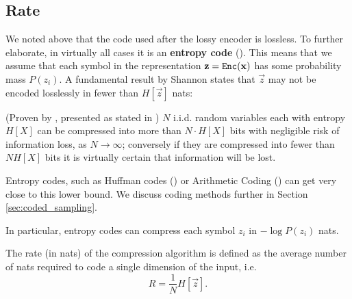 \subsection{Rate}
We noted above that the code used after the lossy encoder is lossless. To
further elaborate, in virtually all cases it is an \textbf{entropy code}
(\cite{goyal2001theoretical}). This means that we assume that each symbol
in the representation $\mathbf{z} = \mathtt{Enc}(\mathbf{x})$ has some probability mass
$P(z_i)$. A fundamental result by Shannon states that $\vec{z}$ may not be
encoded losslessly in fewer than $H[\vec{z}]$ nats:
\begin{theorem}{(Proven by \cite{shannon1998mathematical}, presented as stated in
    \cite{mackay2003information})}
$N$ i.i.d. random variables each with entropy $H[X]$ can be compressed into more
than $N\cdot H[X]$ bits with negligible risk of information loss, as $N
\rightarrow \infty$; conversely if they are compressed into fewer than $NH[X]$ bits it is virtually certain that information will be lost.
\end{theorem}
Entropy codes, such as Huffman codes (\cite{huffman1952method}) or Arithmetic
Coding (\cite{rissanen1981universal}) can get very close to this lower bound.
We discuss coding methods further in Section \ref{sec:coded_sampling}. 
\begin{framed}
  In particular, entropy codes can compress each symbol $z_i$ in $-\log P(z_i)$ nats.
\end{framed}
The rate (in nats) of the compression algorithm is defined
as the average number of nats required to code a single dimension of the input, i.e.
\[
  R = \frac{1}{N} H[\vec{z}].
\]
